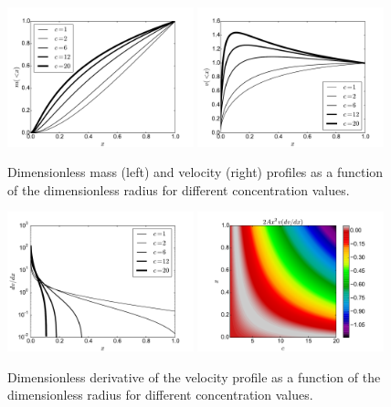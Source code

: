 \documentclass[useAMS,usenatbib]{mn2e}
\begin{document}
\begin{figure}
\begin{center}
  \includegraphics[width=0.48\textwidth]{nfw_normalized.pdf}
  \includegraphics[width=0.48\textwidth]{vel_normalized.pdf}
\end{center}
\caption{Dimensionless mass (left) and velocity (right) profiles as a
  function of the dimensionless radius for different concentration
  values. \label{fig:profiles}}
\end{figure}

\begin{figure}
\begin{center}
  \includegraphics[width=0.48\textwidth]{dv_dx.pdf}
  \includegraphics[width=0.48\textwidth]{zeros.pdf}
\end{center}
\caption{Dimensionless derivative of the velocity profile as a
  function of the dimensionless radius for different concentration
  values. \label{fig:profiles}}
\end{figure}
\end{document}
